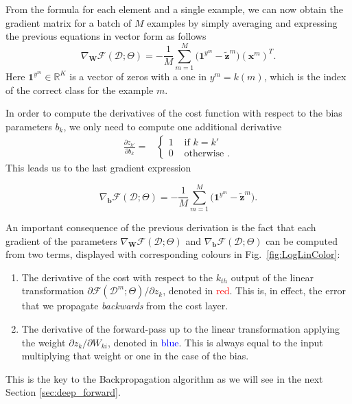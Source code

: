 \noindent From the formula for each element and a single example, we can now obtain the gradient matrix for a batch of $M$ examples by simply averaging and expressing the previous equations in vector form as follows
\begin{equation}
\nabla_\mathbf{W}\mathcal{F}(\mathcal{D};\Theta) = -\frac{1}{M}\sum_{m=1}^{M} \Big(\mathrm{\mathbf{1}}^{y^m} - \tilde{\mathbf{z}}^m \Big) \left(\mathbf{x}^m\right)^T.
\label{gradWeigths}
\end{equation}
%
Here $\mathrm{\mathbf{1}}^{y^m} \in \mathbb{R}^{K}$ is a vector of zeros with a one in $y^m=k(m)$, which is
the index of the correct class for the example $m$.

In order to compute the derivatives of the cost function with respect to the
bias parameters $b_{k}$, we only need to compute one additional derivative
\begin{align}
\frac{\partial z_{k'}}{\partial b_{k}} =
  &\begin{cases}
      1  &  \mbox{ if } k = k'\\
      0  &  \mbox{ otherwise }.
  \end{cases}
  \label{eqn:eqsilonq}
\end{align}
%
This leads us to the last gradient expression

\begin{equation}
\nabla_\mathbf{b}\mathcal{F}(\mathcal{D};\Theta) = -\frac{1}{M}\sum_{m=1}^{M} \Big(\mathrm{\mathbf{1}}^{y^m} - \tilde{\mathbf{z}}^m \Big).
\label{eq:gradBias}
\end{equation}

\noindent An important consequence of the previous derivation is the fact that each
gradient of the parameters $\nabla_\mathbf{W}\mathcal{F}(\mathcal{D};\Theta)$ and $\nabla_\mathbf{b}\mathcal{F}(\mathcal{D};\Theta)$ can be computed from two terms, displayed with corresponding colours in Fig.~\ref{fig:LogLinColor}:
%
\begin{enumerate}
        \item The derivative of the cost with respect to the $k_{th}$ output of the linear transformation $\partial \mathcal{F}(\mathcal{D}^m;\Theta)/\partial z_k$, denoted in \textcolor{red}{red}. This is, in effect, the error that we propagate \textit{backwards} from the cost layer.
\item The derivative of the forward-pass up to the linear transformation applying the weight $\partial z_k/\partial W_{ki}$, denoted in \textcolor{blue}{blue}. This is always equal to the input multiplying that weight or one in the case of the bias.
\end{enumerate}
%
\noindent This is the key to the Backpropagation algorithm as we will see in the next Section \ref{sec:deep_forward}.

